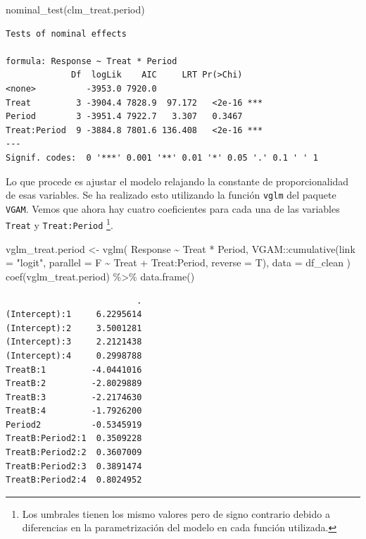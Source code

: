 \documentclass[
  12pt,
  a4paper,
  extrafontsizes,
  onecolumn,
  openright]{memoir}
\newenvironment{Shaded}{\begin{snugshade}}{\end{snugshade}}
\newcommand{\AttributeTok}[1]{\textcolor[rgb]{0.40,0.45,0.13}{#1}}
\newcommand{\FunctionTok}[1]{\textcolor[rgb]{0.28,0.35,0.67}{#1}}
\newcommand{\NormalTok}[1]{\textcolor[rgb]{0.00,0.23,0.31}{#1}}
\newcommand{\OtherTok}[1]{\textcolor[rgb]{0.00,0.23,0.31}{#1}}
\newcommand{\SpecialCharTok}[1]{\textcolor[rgb]{0.37,0.37,0.37}{#1}}
\newcommand{\StringTok}[1]{\textcolor[rgb]{0.13,0.47,0.30}{#1}}
\begin{document}
\scriptsize

\begin{Shaded}
\begin{Highlighting}[]
\FunctionTok{nominal\_test}\NormalTok{(clm\_treat.period)}
\end{Highlighting}
\end{Shaded}

\begin{verbatim}
Tests of nominal effects

formula: Response ~ Treat * Period
             Df  logLik    AIC     LRT Pr(>Chi)    
<none>          -3953.0 7920.0                     
Treat         3 -3904.4 7828.9  97.172   <2e-16 ***
Period        3 -3951.4 7922.7   3.307   0.3467    
Treat:Period  9 -3884.8 7801.6 136.408   <2e-16 ***
---
Signif. codes:  0 '***' 0.001 '**' 0.01 '*' 0.05 '.' 0.1 ' ' 1
\end{verbatim}

\normalsize

Lo que procede es ajustar el modelo relajando la constante de
proporcionalidad de esas variables. Se ha realizado esto utilizando la
función \texttt{vglm} del paquete \texttt{VGAM}. Vemos que ahora hay
cuatro coeficientes para cada una de las variables \texttt{Treat} y
\texttt{Treat:Period} \footnote{Los umbrales tienen los mismo valores
  pero de signo contrario debido a diferencias en la parametrización del
  modelo en cada función utilizada.}.

\scriptsize

\begin{Shaded}
\begin{Highlighting}[]
\NormalTok{vglm\_treat.period }\OtherTok{\textless{}{-}} \FunctionTok{vglm}\NormalTok{(}
\NormalTok{    Response }\SpecialCharTok{\textasciitilde{}}\NormalTok{ Treat }\SpecialCharTok{*}\NormalTok{ Period,}
\NormalTok{    VGAM}\SpecialCharTok{::}\FunctionTok{cumulative}\NormalTok{(}\AttributeTok{link =} \StringTok{"logit"}\NormalTok{, }\AttributeTok{parallel =}\NormalTok{ F }\SpecialCharTok{\textasciitilde{}}\NormalTok{ Treat }\SpecialCharTok{+}\NormalTok{ Treat}\SpecialCharTok{:}\NormalTok{Period, }\AttributeTok{reverse =}\NormalTok{ T),}
    \AttributeTok{data =}\NormalTok{ df\_clean}
\NormalTok{)}
\FunctionTok{coef}\NormalTok{(vglm\_treat.period) }\SpecialCharTok{\%\textgreater{}\%} \FunctionTok{data.frame}\NormalTok{()}
\end{Highlighting}
\end{Shaded}

\begin{verbatim}
                          .
(Intercept):1     6.2295614
(Intercept):2     3.5001281
(Intercept):3     2.2121438
(Intercept):4     0.2998788
TreatB:1         -4.0441016
TreatB:2         -2.8029889
TreatB:3         -2.2174630
TreatB:4         -1.7926200
Period2          -0.5345919
TreatB:Period2:1  0.3509228
TreatB:Period2:2  0.3607009
TreatB:Period2:3  0.3891474
TreatB:Period2:4  0.8024952
\end{verbatim}
\end{document}
